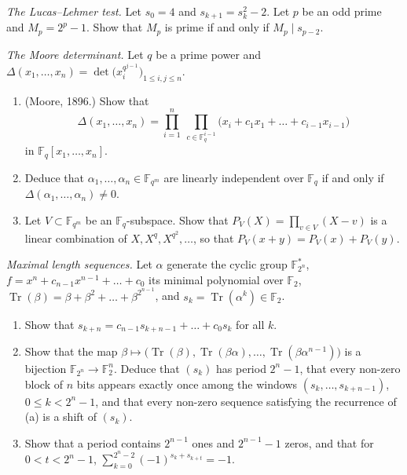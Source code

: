 \begin{exercise}[$\star\star\star$]\label{pb:lucaslehmer}
\emph{The Lucas--Lehmer test.} Let $s_0=4$ and $s_{k+1}=s_k^2-2$. Let $p$ be an odd prime and $M_p=2^p-1$. Show that $M_p$
is prime if and only if $M_p\mid s_{p-2}$.
\end{exercise}

\begin{exercise}[$\star\star$]\label{pb:moore}
\emph{The Moore determinant.} Let $q$ be a prime power and $\Delta(x_1,\dots,x_n)=\det\bigl(x_i^{q^{j-1}}\bigr)_{1\le i,j\le n}$.
\begin{enumerate}[label=(\alph*)]
\item (Moore, 1896.) Show that
\[
\Delta(x_1,\dots,x_n)=\prod_{i=1}^n\ \prod_{c\in\mathbb F_q^{i-1}}\bigl(x_i+c_1x_1+\dots+c_{i-1}x_{i-1}\bigr)
\]
in $\mathbb F_q[x_1,\dots,x_n]$.
\item Deduce that $\alpha_1,\dots,\alpha_n\in\mathbb F_{q^m}$ are linearly independent over $\mathbb F_q$ if and only if
$\Delta(\alpha_1,\dots,\alpha_n)\ne0$.
\item Let $V\subset\mathbb F_{q^m}$ be an $\mathbb F_q$-subspace. Show that $P_V(X)=\prod_{v\in V}(X-v)$ is a linear combination
of $X,X^q,X^{q^2},\dots$, so that $P_V(x+y)=P_V(x)+P_V(y)$.
\end{enumerate}
\end{exercise}

\begin{exercise}[$\star\star$]\label{pb:mseq}
\emph{Maximal length sequences.} Let $\alpha$ generate the cyclic group $\mathbb F_{2^n}^*$, $f=x^n+c_{n-1}x^{n-1}+\dots+c_0$ its
minimal polynomial over $\mathbb F_2$, $\operatorname{Tr}(\beta)=\beta+\beta^2+\dots+\beta^{2^{n-1}}$, and
$s_k=\operatorname{Tr}(\alpha^k)\in\mathbb F_2$.
\begin{enumerate}[label=(\alph*)]
\item Show that $s_{k+n}=c_{n-1}s_{k+n-1}+\dots+c_0s_k$ for all $k$.
\item Show that the map $\beta\mapsto\bigl(\operatorname{Tr}(\beta),\operatorname{Tr}(\beta\alpha),\dots,\operatorname{Tr}(\beta\alpha^{n-1})\bigr)$ is a bijection
$\mathbb F_{2^n}\to\mathbb F_2^n$. Deduce that $(s_k)$ has period $2^n-1$, that every non-zero block of $n$ bits appears exactly
once among the windows $(s_k,\dots,s_{k+n-1})$, $0\le k<2^n-1$, and that every non-zero sequence satisfying the recurrence of (a)
is a shift of $(s_k)$.
\item Show that a period contains $2^{n-1}$ ones and $2^{n-1}-1$ zeros, and that for $0<t<2^n-1$,
$\sum_{k=0}^{2^n-2}(-1)^{s_k+s_{k+t}}=-1$.
\end{enumerate}
\end{exercise}

